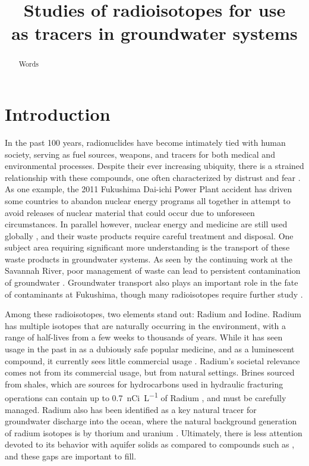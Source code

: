 \documentclass[twoside,12pt,titlepage]{article}
\title{Studies of radioisotopes for use \\as tracers in groundwater systems}
\author{\machen}
\newcommand{\isotope}[2]{\ch{^{#1}#2}}
\begin{document}
\maketitle
\thispagestyle{plain}

\begin{abstract}
Words
\end{abstract}

\section{Introduction}

In the past 100 years, radionuclides have become intimately tied with human society, serving as fuel sources, weapons, and tracers for both medical and environmental processes. Despite their ever increasing ubiquity, there is a strained relationship with these compounds, one often characterized by distrust and fear \cite{Hohenemser1977}. As one example, the 2011 Fukushima Dai-ichi Power Plant accident has driven some countries to abandon nuclear energy programs all together in attempt to avoid releases of nuclear material that could occur due to unforeseen circumstances. In parallel however, nuclear energy and medicine are still used globally \cite{Ramana2013}, and their waste products require careful treatment and disposal. One subject area requiring significant more understanding is the transport of these waste products in groundwater systems. As seen by the continuing work at the Savannah River, poor management of waste can lead to persistent contamination of groundwater \cite{Emerson2014}. Groundwater transport also plays an important role in the fate of contaminants at Fukushima, though many radioisotopes require further study \cite{Steinhauser2014}.
\par Among these radioisotopes, two elements stand out: Radium and Iodine. Radium has multiple isotopes that are naturally occurring in the environment, with a range of half-lives from a few weeks to thousands of years. While it has seen usage in the past in as a dubiously safe popular medicine, and as a luminescent compound, it currently sees little commercial usage \cite{WikiRadium}. Radium’s societal relevance comes not from its commercial usage, but from natural settings. Brines sourced from shales, which are sources for hydrocarbons used in hydraulic fracturing operations can contain up to \SI{0.7}{\nano Ci\per\liter} of Radium \cite{Barbot2013}, and must be carefully managed. Radium also has been identified as a key natural tracer for groundwater discharge into the ocean, where the natural background generation of radium isotopes is by thorium and uranium \cite{Moore2000}. Ultimately, there is less attention devoted to its behavior with aquifer solids as compared to compounds such as \isotope{137}{Cs} \cite{Steinhauser2014}, and these gaps are important to fill.
\end{document}
